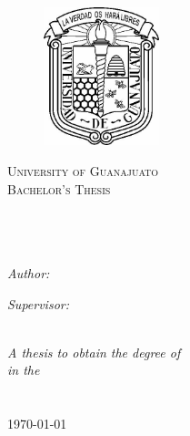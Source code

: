 \documentclass[11pt, oneside, a4paper]{Thesis} %
\begin{document}
\begin{titlepage}
\begin{center}

\begin{figure}[htbp]
	\centering
		\includegraphics[width=0.30\textwidth]{Figures/uni.jpg}
\end{figure}

\textsc{\LARGE University of Guanajuato}\\[1.5cm] %
\textsc{\Large Bachelor's Thesis }\\[0.5cm] %

\HRule \\[0.4cm] %
{\huge \bfseries \ttitle}\\[0.4cm] %
\HRule \\[1.5cm] %

\begin{minipage}{0.4\textwidth}
\begin{flushleft} \large
\emph{Author:}\\
{\authornames} %
\end{flushleft}
\end{minipage}
\begin{minipage}{0.4\textwidth}
\begin{flushright} \large
\emph{Supervisor:} \\
{\supname} %
\end{flushright}
\end{minipage}\\[2cm]

\large \textit{A thesis to obtain the degree of \degreename}\\[0.3cm] %
\textit{in the}\\[0.4cm]
\groupname\\\deptname\\[2cm] %

{\large \today}\\[4cm] %

\vfill
\end{center}

\end{titlepage}
\end{document}
